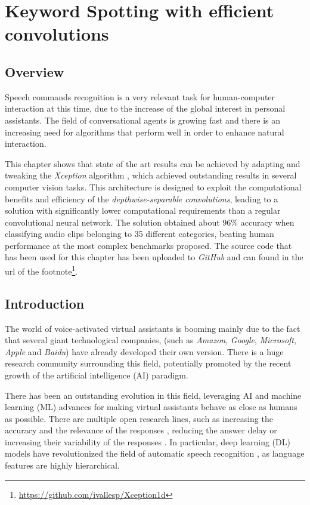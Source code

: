 
\chapter{Keyword Spotting with efficient convolutions} \label{ch:kws}

\section{Overview}
Speech commands recognition is a very relevant task for human-computer interaction at this time, due to the increase of the global interest in personal assistants. The field of conversational agents is growing fast and there is an increasing need for algorithms that perform well in order to enhance natural interaction. 

This chapter shows that state of the art results can be achieved by adapting and tweaking the \textit{Xception} algorithm \autocite{chollet2017}, which achieved outstanding results in several computer vision tasks. This architecture is designed to exploit the computational benefits and efficiency of the \textit{depthwise-separable convolutions}, leading to a solution with significantly lower computational requirements than a regular convolutional neural network. The solution obtained about 96\% accuracy when classifying audio clips belonging to 35 different categories, beating human performance at the most complex benchmarks proposed.
 The source code that has been used for this chapter has been uploaded to \textit{GitHub} and can found in the url of the footnote\footnote{\url{https://github.com/ivallesp/Xception1d}}.


\section{Introduction}
The world of voice-activated virtual assistants is booming mainly due to the fact that several giant technological companies, (such as \textit{Amazon}, \textit{Google}, \textit{Microsoft}, \textit{Apple} and \textit{Baidu}) have already developed their own version. There is a huge research community surrounding this field, potentially promoted by the recent growth of the artificial intelligence (AI) paradigm.

There has been an outstanding evolution in this field, leveraging AI and machine learning (ML) advances for  making virtual assistants behave as close as humans as possible. There are multiple open research lines, such as increasing the accuracy and the relevance of the responses \autocite{milabot2017}, reducing the answer delay \autocite{Han2017} or increasing their variability of the responses \autocite{Li2017}. In particular, deep learning (DL) models have revolutionized the field of automatic speech recognition \autocite{Nassif2019}, as language features are highly hierarchical. 

